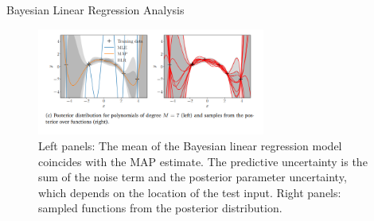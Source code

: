 \documentclass{beamer}
\begin{document}
\begin{frame}{Bayesian Linear Regression Analysis}

\begin{figure}[htp]
\centering
\includegraphics[width=7.5cm]{figures/blr23.png}
\caption{ Left
panels: The mean of the
Bayesian linear
regression model
coincides with the
MAP estimate. The
predictive
uncertainty is the
sum of the noise
term and the
posterior parameter
uncertainty, which
depends on the
location of the test
input. Right panels:
sampled functions
from the posterior
distribution.}
\label{fig:blrfig23}
\end{figure}

\end{frame}
%
%
%
\end{document}
